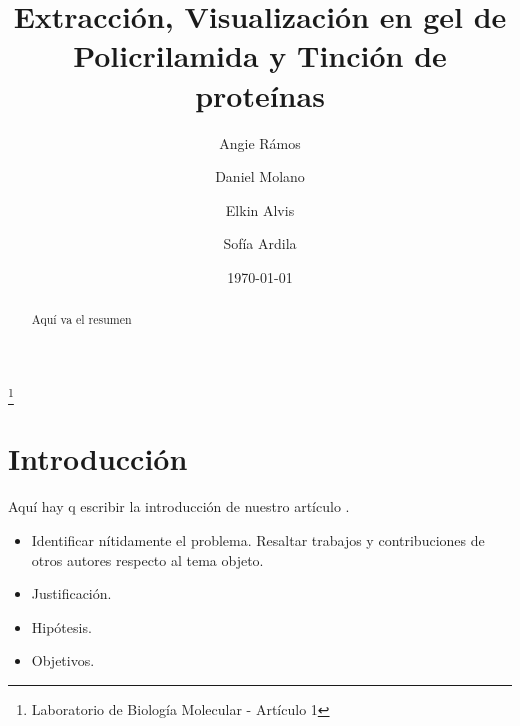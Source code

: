 \documentclass[%
 reprint,
 amsmath,amssymb,
 aps,
showkeys
]{revtex4-1}
\begin{document}

\title{Extracción, Visualización en gel de Policrilamida y Tinción de proteínas }%
\thanks{Laboratorio de Biología Molecular - Artículo 1}%

\author{Angie Rámos}
\author{Daniel Molano}%
\author{Elkin Alvis}
\author{Sof\'ia Ardila}

%


\date[Fecha: ]{\today}%

\begin{abstract}
Aquí va el resumen
\end{abstract}

\maketitle


\section{\label{sec:Intro}Introducción}
	Aquí hay q escribir la introducción de nuestro artículo \cite{Alfonso2010a}. \\
	
	\begin{itemize}
		\item Identificar nítidamente el problema.
		\subitem Resaltar trabajos y contribuciones de otros autores respecto al tema objeto.
		\item Justificación.
		\item Hipótesis. 
		\item Objetivos.
	\end{itemize}
	
\end{document}
